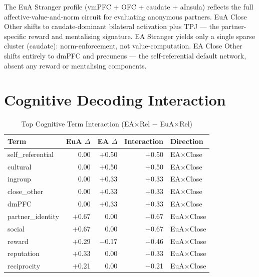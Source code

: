 \documentclass[11pt,a4paper]{report}
\begin{document}
The \textcolor{euaBlue}{EuA Stranger} profile (vmPFC + OFC + caudate + aInsula) reflects the
full affective-value-and-norm circuit for evaluating anonymous partners.
\textcolor{euaBlue}{EuA Close Other} shifts to caudate-dominant bilateral activation plus TPJ
--- the partner-specific reward and mentalising signature.
\textcolor{eaRed}{EA Stranger} yields only a single sparse cluster (caudate): norm-enforcement,
not value-computation.
\textcolor{eaRed}{EA Close Other} shifts entirely to dmPFC and precuneus --- the self-referential
default network, absent any reward or mentalising components.

\section*{Cognitive Decoding Interaction}

\begin{table}[ht]
\centering\small
\caption{Top Cognitive Term Interaction (EA$\times$Rel $-$ EuA$\times$Rel)}
\label{tab:decode}
\begin{tabular}{lrrrl}
\toprule
\textbf{Term} & \textbf{EuA} $\Delta$ & \textbf{EA} $\Delta$ & \textbf{Interaction} & \textbf{Direction} \\
\midrule
self\_referential & 0.00 & $+$0.50 & $+$0.50 & \textcolor{eaRed}{EA$\times$Close} \\
cultural          & 0.00 & $+$0.50 & $+$0.50 & \textcolor{eaRed}{EA$\times$Close} \\
ingroup           & 0.00 & $+$0.33 & $+$0.33 & \textcolor{eaRed}{EA$\times$Close} \\
close\_other      & 0.00 & $+$0.33 & $+$0.33 & \textcolor{eaRed}{EA$\times$Close} \\
dmPFC             & 0.00 & $+$0.33 & $+$0.33 & \textcolor{eaRed}{EA$\times$Close} \\
\midrule
partner\_identity & $+$0.67 & 0.00 & $-$0.67 & \textcolor{euaBlue}{EuA$\times$Close} \\
social            & $+$0.67 & 0.00 & $-$0.67 & \textcolor{euaBlue}{EuA$\times$Close} \\
reward            & $+$0.29 & $-$0.17 & $-$0.46 & \textcolor{euaBlue}{EuA$\times$Close} \\
reputation        & $+$0.33 & 0.00 & $-$0.33 & \textcolor{euaBlue}{EuA$\times$Close} \\
reciprocity       & $+$0.21 & 0.00 & $-$0.21 & \textcolor{euaBlue}{EuA$\times$Close} \\
\bottomrule
\end{tabular}
\end{table}
\end{document}
